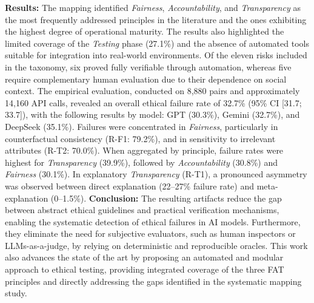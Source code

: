 \textbf{Results:} The mapping identified \textit{Fairness}, \textit{Accountability}, and \textit{Transparency} as the most frequently addressed principles in the literature and the ones exhibiting the highest degree of operational maturity. The results also highlighted the limited coverage of the \textit{Testing} phase (27.1\%) and the absence of automated tools suitable for integration into real-world environments. Of the eleven risks included in the taxonomy, six proved fully verifiable through automation, whereas five require complementary human evaluation due to their dependence on social context. The empirical evaluation, conducted on 8,880 pairs and approximately 14,160 API calls, revealed an overall ethical failure rate of 32.7\% (95\% CI [31.7; 33.7]), with the following results by model: GPT (30.3\%), Gemini (32.7\%), and DeepSeek (35.1\%). Failures were concentrated in \textit{Fairness}, particularly in counterfactual consistency (R-F1: 79.2\%), and in sensitivity to irrelevant attributes (R-T2: 70.0\%). When aggregated by principle, failure rates were highest for \textit{Transparency} (39.9\%), followed by \textit{Accountability} (30.8\%) and \textit{Fairness} (30.1\%). In explanatory \textit{Transparency} (R-T1), a pronounced asymmetry was observed between direct explanation (22--27\% failure rate) and meta-explanation (0--1.5\%).
\textbf{Conclusion:} The resulting artifacts reduce the gap between abstract ethical guidelines and practical verification mechanisms, enabling the systematic detection of ethical failures in AI models. Furthermore, they eliminate the need for subjective evaluators, such as human inspectors or LLMs-as-a-judge, by relying on deterministic and reproducible oracles. This work also advances the state of the art by proposing an automated and modular approach to ethical testing, providing integrated coverage of the three FAT principles and directly addressing the gaps identified in the systematic mapping study.